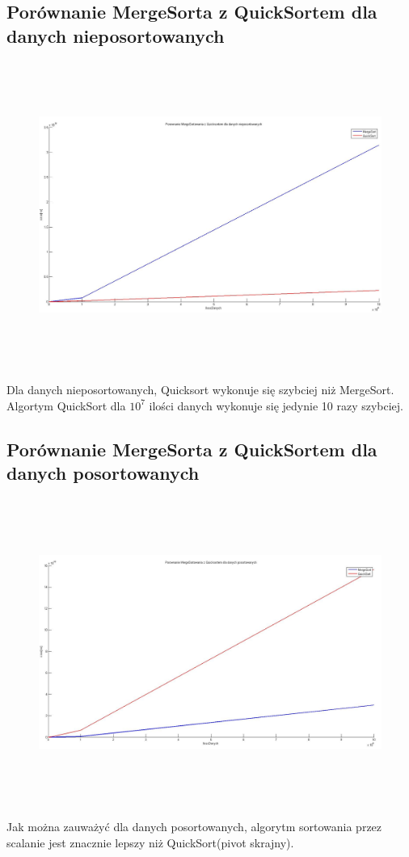 \documentclass[a4paper,11pt]{article}
\begin{document}
\subsection{Porównanie MergeSorta z QuickSortem dla danych nieposortowanych}
\begin{center}
\begin{figure}[h!]
\includegraphics[width=12.5cm,height=10cm]{Wykresy2/MergeQuickNieposortowane}
\end{figure}
\end{center}
Dla danych nieposortowanych, Quicksort wykonuje się szybciej niż MergeSort. Algortym QuickSort  dla $10^{7}$ ilości danych wykonuje się jedynie 10 razy szybciej.
\newpage
\subsection{Porównanie MergeSorta z QuickSortem dla danych posortowanych}
\begin{center}
\begin{figure}[h!]
\includegraphics[width=12.5cm,height=10cm]{Wykresy2/MergeQuickPosortowane}
\end{figure}
\end{center}
Jak można zauważyć dla danych posortowanych, algorytm sortowania przez scalanie jest znacznie lepszy niż QuickSort(pivot skrajny).
\newpage
\end{document}
